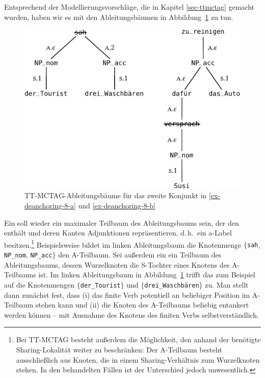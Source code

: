 Entsprechend der Modellierungsvorschläge, die in Kapitel \ref{sec-ttmctag} gemacht wurden, haben wir es mit den Ableitungsbäumen in Abbildung~\ref{fig-deanchoring-10} zu tun. 
\begin{figure}[t]
\centering
\includegraphics{graphics/abb826.pdf}
\caption{\label{fig-deanchoring-10}TT-MCTAG-Ableitungsbäume für das zweite Konjunkt in \ref{ex-deanchoring-8-a} und \ref{ex-deanchoring-8-b}}
\end{figure}
Ein  soll wieder ein maximaler Teilbaum des Ableitungsbaums sein, der den  enthält und deren Kanten Adjunktionen repräsentieren, d.\,h.\ ein {\sc a}-Label besitzen.\footnote{Bei TT-MCTAG besteht außerdem die Möglichkeit, den   anhand der benötigte Sharing-Lokalität weiter zu beschränken: Der A-Teilbaum besteht ausschlie\ss lich aus Knoten, die in einem Sharing-Verhältnis zum Wurzelknoten stehen. In den behandelten Fällen ist der Unterschied jedoch unwesentlich.} Beispielsweise bildet im linken Ableitungsbaum die Knotenmenge $\{${\tt sah}, {\tt NP\_nom}, {\tt NP\_acc}$\}$ den A-Teilbaum. Sei au\ss erdem ein  ein Teilbaum des Ableitungsbaums, dessen Wurzelknoten die S-Tochter eines Knotens des A-Teilbaums ist. Im linken Ableitungsbaum in Abbildung~\ref{fig-deanchoring-10} trifft das zum Beispiel auf die Knotenmengen $\{${\tt der\_Tourist}$\}$ und $\{${\tt drei\_Waschbären}$\}$ zu. Man stellt dann zunächst fest, dass (i) das finite Verb potentiell an beliebiger Position im A-Teilbaum stehen kann und (ii) die Knoten des A-Teilbaums beliebig entankert werden können -- mit Ausnahme des Knotens des finiten Verbs selbstverständlich. 

